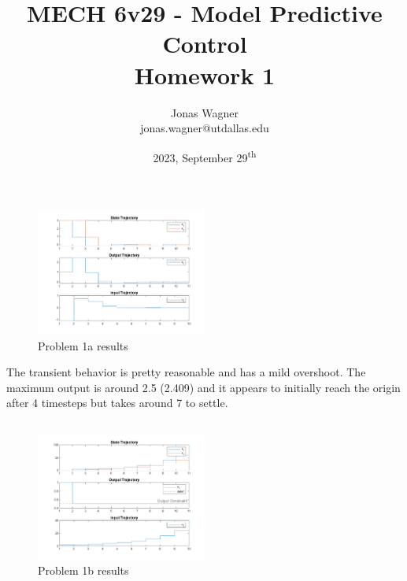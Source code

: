 \documentclass[]{article}
\title{
    MECH 6v29 - Model Predictive Control\\ 
    Homework 1
}
\author{Jonas Wagner\\ jonas.wagner@utdallas.edu}
\date{2023, September 29\textsuperscript{th}}
\begin{document}
\maketitle

\tableofcontents

\newpage
\section{}

\subsection{}

\begin{figure}[h]
    \centering
    \includegraphics[width = 0.5\textwidth]{figs/pblm1a.png}
    \caption{Problem 1a results}
\end{figure}

The transient behavior is pretty reasonable and has a mild overshoot.
The maximum output is around 2.5 (2.409) and it appears to initially reach the origin after 4 timesteps but takes around 7 to settle.

\subsection{}
\begin{figure}[h]
    \centering
    \includegraphics[width = 0.5\textwidth]{figs/pblm1b.png}
    \caption{Problem 1b results}
\end{figure}
\end{document}
